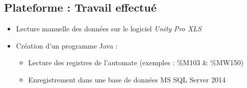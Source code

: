     \subsection{Plateforme : Travail effectué}
        \begin{frame}[allowframebreaks]
             \begin{block}{}
                \begin{itemize}
                    [square]
                    \item Lecture manuelle des données sur le logiciel \textit{Unity Pro XLS}
                    \item Création d'un programme Java :
                    \begin{itemize}
                        \item Lecture des registres de l'automate (exemples : \%M103 \& \%MW150)
                        \item Enregistrement dans une base de données MS SQL Server 2014
                    \end{itemize}
                \end{itemize}
            \end{block}
            

\end{frame}
